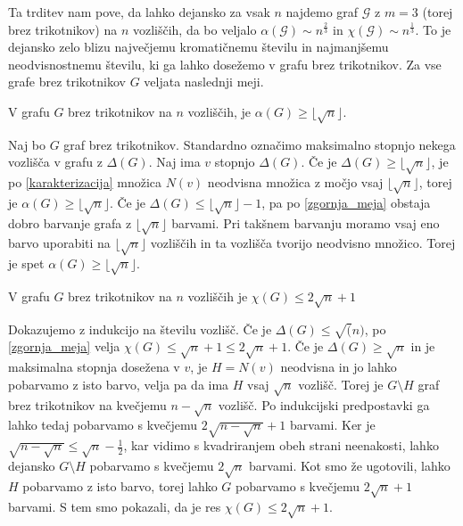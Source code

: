 \documentclass[mat1, tisk]{fmfdelo}
\begin{document}
Ta trditev nam pove, da lahko dejansko za vsak $n$ najdemo graf $\mathcal{G}$ z $m = 3$ (torej brez trikotnikov) na $n$ vozliščih, da bo veljalo $\alpha(\mathcal{G}) \sim n^{\frac{2}{3}}$ in $\chi(\mathcal{G}) \sim n^{\frac{1}{3}}$. To je dejansko zelo blizu največjemu kromatičnemu številu in najmanjšemu neodvisnostnemu številu, 
ki ga lahko dosežemo v grafu brez trikotnikov. Za vse grafe brez trikotnikov $G$ veljata naslednji meji.

    \begin{trditev}
        V grafu $G$ brez trikotnikov na $n$ vozliščih, je $\alpha(G) \geq \lfloor\sqrt{n}\rfloor$.
    \end{trditev}

    \begin{dokaz}
        Naj bo $G$ graf brez trikotnikov. Standardno označimo maksimalno stopnjo nekega vozlišča v grafu z $\Delta(G)$. Naj ima $v$ stopnjo $\Delta(G)$. Če je $\Delta(G) \geq \lfloor\sqrt{n}\rfloor$, je po \ref{karakterizacija} množica $N(v)$ neodvisna množica z močjo vsaj 
        $\lfloor\sqrt{n}\rfloor$, torej je $\alpha(G) \geq \lfloor\sqrt{n}\rfloor$. Če je $\Delta(G) \leq \lfloor\sqrt{n}\rfloor - 1$, pa po \ref{zgornja_meja} obstaja dobro barvanje grafa z $\lfloor\sqrt{n}\rfloor$ barvami. Pri takšnem barvanju moramo vsaj eno barvo uporabiti
        na $\lfloor\sqrt{n}\rfloor$ vozliščih in ta vozlišča tvorijo neodvisno množico. Torej je spet $\alpha(G) \geq \lfloor\sqrt{n}\rfloor$.
    \end{dokaz}

    \begin{trditev}
        V grafu $G$ brez trikotnikov na $n$ vozliščih je $\chi(G) \leq 2\sqrt{n} + 1$
    \end{trditev}

    \begin{dokaz}
        Dokazujemo z indukcijo na številu vozlišč. Če je $\Delta(G) \leq \sqrt(n)$, po \ref{zgornja_meja} velja $\chi(G) \leq \sqrt{n} + 1 \leq 2\sqrt{n} + 1$. Če je $\Delta(G) \geq \sqrt{n}$ in je maksimalna stopnja dosežena v $v$, je $H = N(v)$ neodvisna in jo lahko pobarvamo z isto barvo, velja
        pa da ima $H$ vsaj $\sqrt{n}$ vozlišč. Torej je $G \setminus H$ graf brez trikotnikov na kvečjemu $n - \sqrt{n}$ vozlišč. Po indukcijski predpostavki ga lahko tedaj pobarvamo s kvečjemu $2\sqrt{n - \sqrt{n}} + 1$ barvami. Ker je $\sqrt{n - \sqrt{n}} \leq \sqrt{n} - \frac{1}{2}$, kar vidimo
        s kvadriranjem obeh strani neenakosti, lahko dejansko $G \setminus H$ pobarvamo s kvečjemu $2\sqrt{n}$ barvami. Kot smo že ugotovili, lahko $H$ pobarvamo z isto barvo, torej lahko $G$ pobarvamo s kvečjemu $2\sqrt{n} + 1$ barvami. S tem smo pokazali, da je res $\chi(G) \leq 2\sqrt{n} + 1$.
    \end{dokaz}
\end{document}
